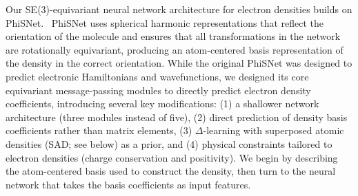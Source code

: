 \documentclass[12pt]{article}
\begin{document}
Our SE(3)-equivariant neural network architecture for electron densities builds on PhiSNet.~\citep{unke2021se}
PhiSNet uses spherical harmonic representations that reflect the orientation of the molecule and ensures that all transformations in the network are rotationally equivariant, producing an atom-centered basis representation of the density in the correct orientation.
While the original PhiSNet was designed to predict electronic Hamiltonians and wavefunctions, we designed its core equivariant message-passing modules to directly predict electron density coefficients, introducing several key modifications: (1) a shallower network architecture (three modules instead of five), (2) direct prediction of density basis coefficients rather than matrix elements, (3) $\Delta$-learning with superposed atomic densities (SAD; see below) as a prior, and (4) physical constraints tailored to electron densities (charge conservation and positivity). 
We begin by describing the atom-centered basis used to construct the density, then turn to the neural network that takes the basis coefficients as input features. 
\end{document}
